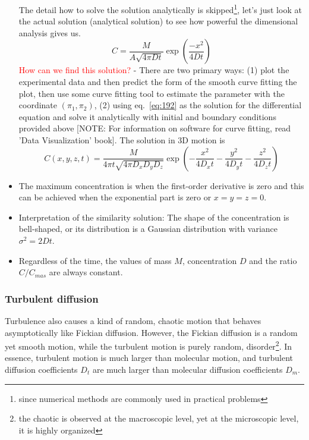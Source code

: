 \begin{itemize}
The detail how to solve the solution analytically is
skipped\footnote{since numerical methods are commonly used in
  practical problems},
let's just look at the actual solution (analytical solution) to see
how powerful the dimensional analysis gives us.
\begin{equation}
  \label{eq:193}
  C =  \frac{M}{A\sqrt{4\pi Dt}} \exp(\frac{-x^2}{4Dt})
\end{equation}
\textcolor{red}{How can we find this solution?} - There are two
primary ways: (1) plot the experimental data and then predict the form
of the smooth curve fitting the plot, then use some curve fitting tool
to estimate the parameter with the coordinate $(\pi_1, \pi_2)$, (2)
using eq.~\eqref{eq:192} as the solution for the differential equation
and solve it analytically with initial and boundary conditions
provided above [NOTE: For information on software for curve fitting, read
'Data Visualization' book].
The solution in 3D motion is
\begin{equation}
  \label{eq:194}
  C(x,y,z,t) = \frac{M}{4\pi t\sqrt{4\pi D_x D_y D_z}}
  \exp(-\frac{x^2}{4D_x t} -\frac{y^2}{4D_y t} -  \frac{z^2}{4D_z t})
\end{equation}

\item The maximum concentration is when the first-order derivative is
  zero and this can be achieved when the exponential part is zero or
  $x=y=z=0$.

\item Interpretation of the similarity solution: The shape of the
  concentration is bell-shaped, or its distribution is a Gaussian
  distribution with variance $\sigma^2 = 2Dt$. 

\item Regardless of the time, the values of mass $M$, concentration
  $D$ and the ratio $C/C_{mas}$ are always constant. 
\end{itemize}


\subsubsection{Turbulent diffusion}
\label{sec:turbulent-diffusion}

Turbulence also causes a kind of random, chaotic motion that behaves
asymptotically like Fickian diffusion. However, the Fickian diffusion
is a random yet smooth motion, while the turbulent motion is purely
random,
disorder\footnote{the chaotic is observed at the macroscopic level,
  yet at the microscopic level, it is highly organized}.
In essence, turbulent motion is much larger than molecular motion, and
turbulent diffusion coefficients $D_t$ are much larger than molecular
diffusion coefficients $D_m$.

